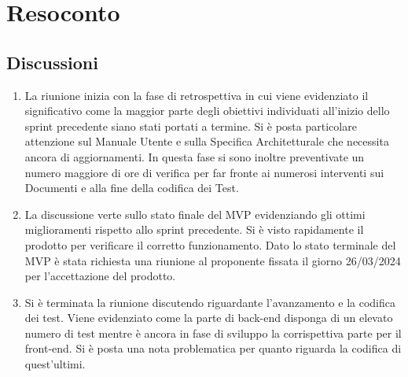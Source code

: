 \section{Resoconto} \label{sec:resoconto}
\subsection{Discussioni} \label{subsec:resdiscussione}
\begin{enumerate}
    \item La riunione inizia con la fase di retrospettiva in cui viene evidenziato il significativo come la maggior parte degli obiettivi individuati all'inizio dello sprint precedente siano stati portati a termine. Si è posta particolare attenzione sul Manuale Utente e sulla Specifica Architetturale che necessita ancora di aggiornamenti. In questa fase si sono inoltre preventivate un numero maggiore di ore di verifica per far fronte ai numerosi interventi sui Documenti e alla fine della codifica dei Test.
    \item La discussione verte sullo stato finale del MVP evidenziando gli ottimi miglioramenti rispetto allo sprint precedente. Si è visto rapidamente il prodotto per verificare il corretto funzionamento. Dato lo stato terminale del MVP è stata richiesta una riunione al proponente fissata il giorno 26/03/2024 per l'accettazione del prodotto.
    \item Si è terminata la riunione discutendo riguardante l'avanzamento e la codifica dei test. Viene evidenziato come la parte di back-end disponga di un elevato numero di test mentre è ancora in fase di sviluppo la corrispettiva parte per il front-end. Si è posta una nota problematica per quanto riguarda la codifica di quest'ultimi.
\end{enumerate}


